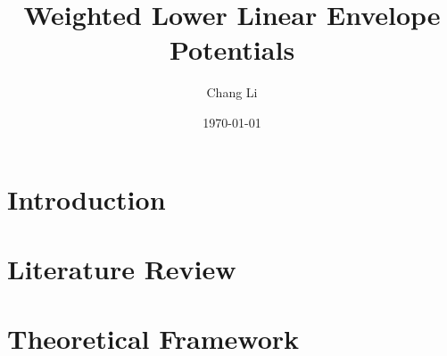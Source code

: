 \documentclass{article}
\title{Weighted Lower Linear Envelope Potentials}
\author{Chang Li}
\date{\today}
\begin{document}
	\maketitle
	
	\section{Introduction}
	
	\section{Literature Review}
	
	\section{Theoretical Framework}
	
\end{document}

